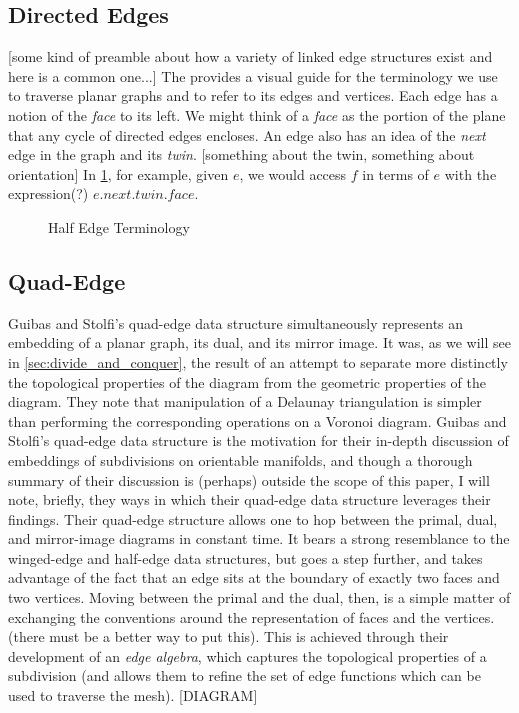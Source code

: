 \documentclass[12pt,twoside]{reedthesis}
\begin{document}
    \subsection{Directed Edges}
    \label{sub:half_edge_ds}
      [some kind of preamble about how a variety of linked edge structures exist and here is a common one...] The  provides a visual guide for the terminology we use to traverse planar graphs and to refer to its edges and vertices. Each edge has a notion of the \emph{face} to its left. We might think of a \emph{face} as the portion of the plane that any cycle of directed edges encloses. An edge also has an idea of the \emph{next} edge in the graph and its \emph{twin}. [something about the twin, something about orientation]  In \cref{fig:half_edge}, for example, given $e$, we would access $f$ in terms of $e$ with the expression(?) $e.next.twin.face$.

    \begin{figure}[!htb]
      \centering
      
      \caption{Half Edge Terminology}
      \label{fig:half_edge}
    \end{figure}
    \clearpage

    \subsection{Quad-Edge}
    \label{sub:quad_edge}
      Guibas and Stolfi's quad-edge data structure simultaneously represents an embedding of a planar graph, its dual, and its mirror image. It was, as we will see in \cref{sec:divide_and_conquer}, the result of an attempt to separate more distinctly the topological properties of the diagram from the geometric properties of the diagram. They note that manipulation of a Delaunay triangulation is simpler than performing the corresponding operations on a Voronoi diagram.
      Guibas and Stolfi's quad-edge data structure is the motivation for their in-depth discussion of embeddings of subdivisions on orientable manifolds, and though a thorough summary of their discussion is (perhaps) outside the scope of this paper, I will note, briefly, they ways in which their quad-edge data structure leverages their findings. Their quad-edge structure allows one to hop between the primal, dual, and mirror-image diagrams in constant time. It bears a strong resemblance to the winged-edge and half-edge data structures, but goes a step further, and takes advantage of the fact that an edge sits at the boundary of exactly two faces and two vertices. Moving between the primal and the dual, then, is a simple matter of exchanging the conventions around the representation of faces and the vertices. (there must be a better way to put this). This is achieved through their development of an \emph{edge algebra}, which captures the topological properties of a subdivision (and allows them to refine the set of edge functions which can be used to traverse the mesh). [DIAGRAM]
\end{document}
